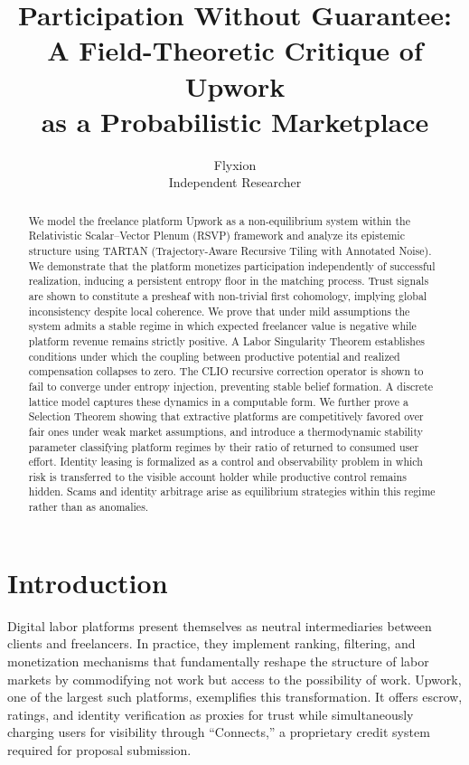 \documentclass[11pt]{article}
\title{Participation Without Guarantee:\\
A Field-Theoretic Critique of Upwork\\
as a Probabilistic Marketplace}
\author{Flyxion\\[0.4em]
\small Independent Researcher}
\date{}
\begin{document}
\maketitle

\begin{abstract}
We model the freelance platform Upwork as a non-equilibrium system within
the Relativistic Scalar--Vector Plenum (RSVP) framework and analyze its
epistemic structure using TARTAN (Trajectory-Aware Recursive Tiling with
Annotated Noise). We demonstrate that the platform monetizes participation
independently of successful realization, inducing a persistent entropy floor
in the matching process. Trust signals are shown to constitute a presheaf
with non-trivial first cohomology, implying global inconsistency despite
local coherence. We prove that under mild assumptions the system admits a
stable regime in which expected freelancer value is negative while platform
revenue remains strictly positive. A Labor Singularity Theorem establishes
conditions under which the coupling between productive potential and realized
compensation collapses to zero. The CLIO recursive correction operator is
shown to fail to converge under entropy injection, preventing stable belief
formation. A discrete lattice model captures these dynamics in a computable
form. We further prove a Selection Theorem showing that extractive platforms
are competitively favored over fair ones under weak market assumptions, and
introduce a thermodynamic stability parameter classifying platform regimes
by their ratio of returned to consumed user effort. Identity leasing is
formalized as a control and observability problem in which risk is transferred
to the visible account holder while productive control remains hidden.
Scams and identity arbitrage arise as equilibrium strategies within this
regime rather than as anomalies.
\end{abstract}

\newpage

\section{Introduction}

Digital labor platforms present themselves as neutral intermediaries between
clients and freelancers. In practice, they implement ranking, filtering, and
monetization mechanisms that fundamentally reshape the structure of labor
markets by commodifying not work but access to the possibility of work.
Upwork, one of the largest such platforms, exemplifies this transformation.
It offers escrow, ratings, and identity verification as proxies for trust
while simultaneously charging users for visibility through ``Connects,'' a
proprietary credit system required for proposal submission.
\end{document}
